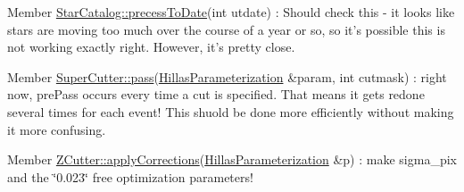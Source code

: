 \label{todo__todo000032}
\hypertarget{todo__todo000032}{}
 
\begin{DoxyDescription}
\item[Member \hyperlink{classStarCatalog_a7b487603d9556b01164515e8fb5fddd9}{StarCatalog::precessToDate}(int utdate) ]: Should check this -\/ it looks like stars are moving too much over the course of a year or so, so it's possible this is not working exactly right. However, it's pretty close. 
\end{DoxyDescription}

\label{todo__todo000033}
\hypertarget{todo__todo000033}{}
 
\begin{DoxyDescription}
\item[Member \hyperlink{classSuperCutter_a10e29b1d569a2b09755e44c31b3c1e61}{SuperCutter::pass}(\hyperlink{structHillasParameterization}{HillasParameterization} \&param, int cutmask) ]: right now, prePass occurs every time a cut is specified. That means it gets redone several times for each event! This shuold be done more efficiently without making it more confusing. 
\end{DoxyDescription}

\label{todo__todo000035}
\hypertarget{todo__todo000035}{}
 
\begin{DoxyDescription}
\item[Member \hyperlink{classZCutter_ad8fc95579fc4b47a518b66e6ea029f61}{ZCutter::applyCorrections}(\hyperlink{structHillasParameterization}{HillasParameterization} \&p) ]: make sigma\_\-pix and the \char`\"{}0.023\char`\"{} free optimization parameters! 
\end{DoxyDescription}